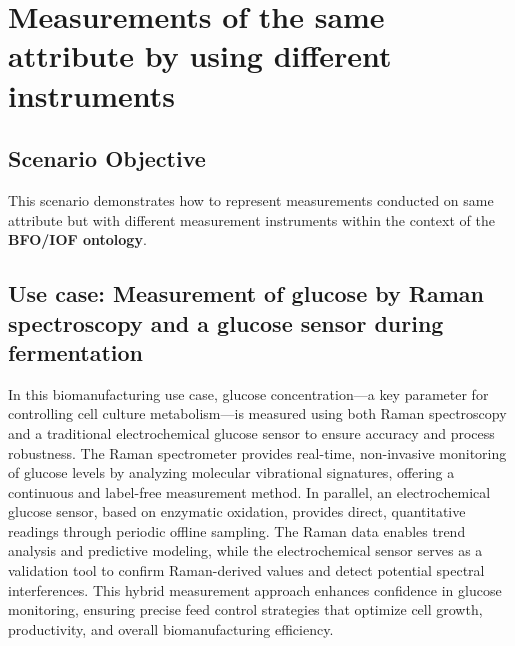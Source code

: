 \section{Measurements of the same attribute by using different instruments}

\subsection*{Scenario Objective}

This scenario demonstrates how to represent measurements conducted on same attribute but with different measurement instruments within the context of the \textbf{BFO/IOF ontology}.
\subsection{Use case: Measurement of glucose by Raman spectroscopy and a glucose sensor during fermentation}
In this biomanufacturing use case, glucose concentration—a key parameter for controlling cell culture metabolism—is measured using both Raman spectroscopy and a traditional electrochemical glucose sensor to ensure accuracy and process robustness. The Raman spectrometer provides real-time, non-invasive monitoring of glucose levels by analyzing molecular vibrational signatures, offering a continuous and label-free measurement method. In parallel, an electrochemical glucose sensor, based on enzymatic oxidation, provides direct, quantitative readings through periodic offline sampling. The Raman data enables trend analysis and predictive modeling, while the electrochemical sensor serves as a validation tool to confirm Raman-derived values and detect potential spectral interferences. 
This hybrid measurement approach enhances confidence in glucose monitoring, ensuring precise feed control strategies that optimize cell growth, productivity, and overall biomanufacturing efficiency.